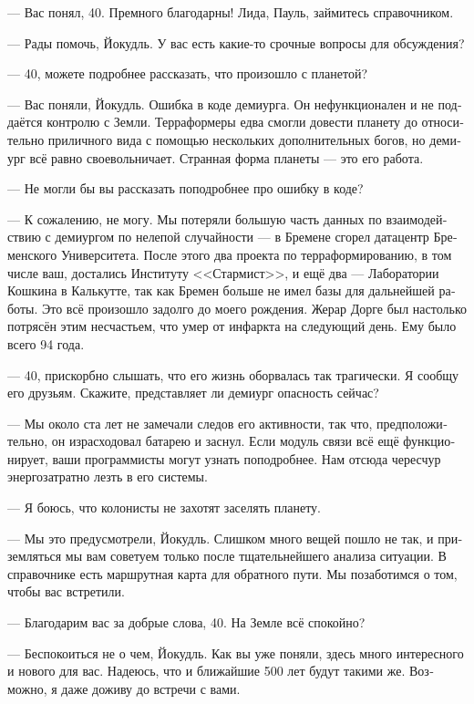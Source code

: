 \documentclass[a4paper,10pt,fleqn]{book}\usepackage{polyglossia}\setdefaultlanguage[babelshorthands=true]{russian}\setotherlanguage{english}\defaultfontfeatures{Ligatures=TeX,Mapping=tex-text}\usepackage{xcolor}\newcommand{\ml}[3]{#2}
\newcommand{\asterism}{\vspace{1em}{\centering\Large\bfseries$\ast~\ast~\ast$\par}\vspace{1em}}
\begin{document}
--- Вас понял, 40.
Премного благодарны!
Лида, Пауль, займитесь справочником.

--- Рады помочь, Йокудль.
У вас есть какие-то срочные вопросы для обсуждения?

--- 40, можете подробнее рассказать, что произошло с планетой?

--- Вас поняли, Йокудль.
Ошибка в коде демиурга.
Он нефункционален и не поддаётся контролю с Земли.
Терраформеры едва смогли довести планету до относительно приличного вида с помощью нескольких дополнительных богов, но демиург всё равно своевольничает.
Странная форма планеты --- это его работа.

--- Не могли бы вы рассказать поподробнее про ошибку в коде?

--- К сожалению, не могу.
Мы потеряли большую часть данных по взаимодействию с демиургом по нелепой случайности --- в Бремене сгорел датацентр Бременского Университета.
После этого два проекта по терраформированию, в том числе ваш, достались Институту <<Стармист>>, и ещё два --- Лаборатории Кошкина в Калькутте, так как Бремен больше не имел базы для дальнейшей работы.
Это всё произошло задолго до моего рождения.
Жерар Дорге был настолько потрясён этим несчастьем, что умер от инфаркта на следующий день.
Ему было всего 94 года.

--- 40, прискорбно слышать, что его жизнь оборвалась так трагически.
Я сообщу его друзьям.
Скажите, представляет ли демиург опасность сейчас?

--- Мы около ста лет не замечали следов его активности, так что, предположительно, он израсходовал батарею и заснул.
Если модуль связи всё ещё функционирует, ваши программисты могут узнать поподробнее.
Нам отсюда чересчур энергозатратно лезть в его системы.

--- Я боюсь, что колонисты не захотят заселять планету.

--- Мы это предусмотрели, Йокудль.
Слишком много вещей пошло не так, и приземляться мы вам советуем только после тщательнейшего анализа ситуации.
В справочнике есть маршрутная карта для обратного пути.
Мы позаботимся о том, чтобы вас встретили.

--- Благодарим вас за добрые слова, 40.
На Земле всё спокойно?

--- Беспокоиться не о чем, Йокудль.
Как вы уже поняли, здесь много интересного и нового для вас.
Надеюсь, что и ближайшие 500 лет будут такими же.
Возможно, я даже доживу до встречи с вами.

\asterism
\end{document}
